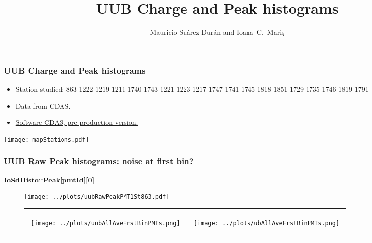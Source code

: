 \documentclass[aspectratio=169]{beamer}
\title{UUB Charge and Peak histograms}
\author{
  Mauricio Su\'arez Dur\'an and Ioana~C.~Mari\c{s}
}
\institute{IIHE-ULB}
\begin{document}
\begin{frame}
  \titlepage
\end{frame}


\begin{frame}
	\frametitle{UUB Charge and Peak histograms}
	\begin{itemize}
		\item Station studied: 863 1222 1219 1211 1740 1743 1221 1223 1217 1747 1741 1745 1818 1851 1729 1735 1746 1819 1791
		\item Data from CDAS.
		\item {\underline {Software CDAS, pre-production version.}}
	\end{itemize}
	\centering
	\texttt{[image: mapStations.pdf]}
\end{frame}



\begin{frame}
  \frametitle{UUB Raw Peak histograms: noise at first bin? }
  {\bf IoSdHisto::Peak[pmtId][0]}
	\begin{figure}
		\centering
    \texttt{[image: ../plots/uubRawPeakPMT1St863.pdf]}
		\begin{tabularx}{\textwidth}{CC}
			\begin{tabular}{l}
				\texttt{[image: ../plots/uubAllAveFrstBinPMTs.png]}
			\end{tabular}
			&
			\begin{tabular}{l}
				\texttt{[image: ../plots/ubAllAveFrstBinPMTs.png]}
			\end{tabular} 
		\end{tabularx}
	\end{figure}
\end{frame}
\end{document}
